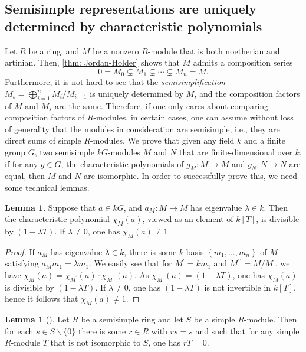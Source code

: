 \documentclass[12pt,a4paper]{report}
\theoremstyle{definition}
\newtheorem{lemma}[theorem]{Lemma}
\theoremstyle{remark}
\theoremstyle{definition}
\begin{document}
\subsection{Semisimple representations are uniquely determined by characteristic polynomials}
Let $R$ be a ring, and $M$ be a nonzero $R$-module that is both noetherian and artinian. Then, \cref{thm: Jordan-Holder} shows that $M$ admits a composition series 
\begin{equation*}
    0 = M_0 \subsetneq M_1\subsetneq \cdots\subsetneq M_n = M.
\end{equation*}
Furthermore, it is not hard to see that the \emph{semisimplification} $M_{s}=\bigoplus_{i=1}^{n}M_i/M_{i-1}$ is uniquely determined by $M$, and the composition factors of $M$ and $M_s$ are the same. Therefore, if one only cares about comparing composition factors of $R$-modules, in certain cases, one can assume without loss of generality that the modules in consideration are semisimple, i.e., they are direct sums of simple $R$-modules.\smallbreak
We prove that given any field $k$ and a finite group $G$, two semisimple $kG$-modules $M$ and $N$ that are finite-dimensional over $k$, if for any $g\in G$, the characteristic polynomials of $g_M: M\to M$ and $g_N: N\to N$ are equal, then $M$ and $N$ are isomorphic. In order to successfully prove this, we need some technical lemmas.
\begin{lemma}\label{lemma: 5.8}
Suppose that $a\in kG$, and $a_M: M\to M$ has eigenvalue $\lambda\in k$. Then the characteristic polynomial $\chi_{M}(a)$, viewed as an element of $k[T]$, is divisible by $(1-\lambda T)$. If $\lambda \neq 0$, one has $\chi_{M}(a) \neq 1$.
\end{lemma}
\begin{proof}
    If $a_{M}$ has eigenvalue $\lambda \in k$, there is some $k$-basis $\left\{m_{1}, \ldots, m_{n}\right\}$ of $M$ satisfying $a_{M} m_{1}=\lambda m_{1}$. We easily see that for $M^{\prime}=k m_{1}$ and $M^{\prime \prime}=M / M^{\prime}$, we have $\chi_{M}(a)=\chi_{M^{\prime}}(a) \cdot \chi_{M^{\prime \prime}}(a)$. As $\chi_{M^{\prime}}(a)=(1-\lambda T)$, one has $\chi_{M}(a)$ is divisible by $(1-\lambda T)$. If $\lambda \neq 0$, one has $(1-\lambda T)$ is not invertible in $k[T]$, hence it follows that $\chi_{M}(a) \neq 1$.
\end{proof}
\begin{lemma}[{\cite[Lemma 5.9]{eggermont_generalizations_2011}}]\label{lemma: 5.9}
Let $R$ be a semisimple ring and let $S$ be a simple $R$-module. Then for each $s \in S \backslash\{0\}$ there is some $r \in R$ with $r s=s$ and such that for any simple $R$-module $T$ that is not isomorphic to $S$, one has $r T=0$.
\end{lemma}
\end{document}
